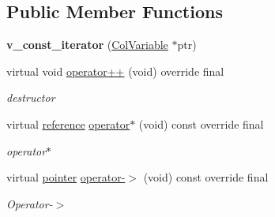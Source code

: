 \subsection*{Public Member Functions}
\begin{DoxyCompactItemize}
\item 
\mbox{\label{class_s_m_spp__di__unipi__it_1_1_one_var_constraint_1_1v__const__iterator_a8dcea4938c80d7e6a1db98262b358195}} 
{\bfseries v\+\_\+const\+\_\+iterator} (\mbox{\hyperlink{class_s_m_spp__di__unipi__it_1_1_col_variable}{Col\+Variable}} $\ast$ptr)
\item 
virtual void \mbox{\hyperlink{class_s_m_spp__di__unipi__it_1_1_one_var_constraint_1_1v__const__iterator_af860fe44bc54c0cbca8e733ab0e954e0}{operator++}} (void) override final
\begin{DoxyCompactList}\small\item\em destructor \end{DoxyCompactList}\item 
\mbox{\label{class_s_m_spp__di__unipi__it_1_1_one_var_constraint_1_1v__const__iterator_aea4d50ffc7b90999612dafe5edb8ca59}} 
virtual \mbox{\hyperlink{class_s_m_spp__di__unipi__it_1_1_variable}{reference}} \mbox{\hyperlink{class_s_m_spp__di__unipi__it_1_1_one_var_constraint_1_1v__const__iterator_aea4d50ffc7b90999612dafe5edb8ca59}{operator$\ast$}} (void) const override final
\begin{DoxyCompactList}\small\item\em operator$\ast$ \end{DoxyCompactList}\item 
\mbox{\label{class_s_m_spp__di__unipi__it_1_1_one_var_constraint_1_1v__const__iterator_af090a4094bcbcae8966745a92278976b}} 
virtual \mbox{\hyperlink{class_s_m_spp__di__unipi__it_1_1_variable}{pointer}} \mbox{\hyperlink{class_s_m_spp__di__unipi__it_1_1_one_var_constraint_1_1v__const__iterator_af090a4094bcbcae8966745a92278976b}{operator-\/$>$}} (void) const override final
\begin{DoxyCompactList}\small\item\em Operator-\/$>$ \end{DoxyCompactList}\item 

\end{DoxyCompactItemize}
